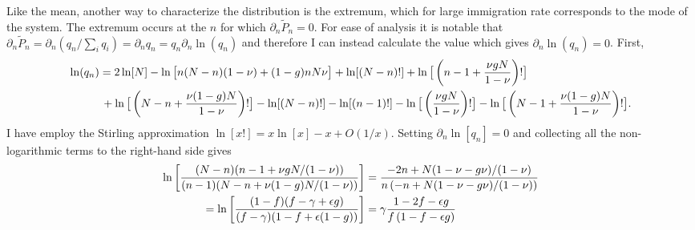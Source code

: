 Like the mean, another way to characterize the distribution is the extremum, which for large immigration rate corresponds to the mode of the system. 
The extremum occurs at the $n$ for which $\partial_n \widetilde{P}_n = 0$. For ease of analysis it is notable that $\partial_n \widetilde{P}_n = \partial_n \left( q_n/\sum_i q_i \right) = \partial_n q_n = q_n \partial_n \ln(q_n)$ and therefore I can instead calculate the value which gives $\partial_n \ln(q_n)=0$. 
First,
\begin{align}
 \ln(q_n) &= 2\ln[N] - \ln\big[n(N-n)(1-\nu)+(1-g)n N\nu\big] + \ln[(N-n)!] + \ln\big[\left(n-1+\frac{\nu g N}{1-\nu}\right)!\big] \\
 		  &\, + \ln\big[\left(N-n+\frac{\nu (1-g) N}{1-\nu}\right)!\big] - \ln[(N-n)!] - \ln[(n-1)!] - \ln\big[\left(\frac{\nu g N}{1-\nu}\right)!\big] - \ln\big[\left(N-1+\frac{\nu (1-g) N}{1-\nu}\right)!\big] . \notag%
\end{align}
I have employ the Stirling approximation $\ln[x!] = x\ln[x] - x + O(1/x)$. 
Setting $\partial_n \ln[q_n]=0$ and collecting all the non-logarithmic terms to the right-hand side gives
\begin{align}
 \ln\left[ \frac{(N-n)(n-1+\nu g N/(1-\nu))}{(n-1)(N-n+\nu(1-g)N/(1-\nu))}\right]  &= \frac{-2n+N(1-\nu-g\nu)/(1-\nu)}{n\left(-n+N(1-\nu-g\nu)/(1-\nu)\right)} \notag \\
=\ln\left[ \frac{(1-f)(f-\gamma+\epsilon g)}{(f-\gamma)(1-f+\epsilon(1-g))}\right] &= \gamma\frac{1-2f-\epsilon g}{f\left(1-f-\epsilon g\right)}
\end{align}
